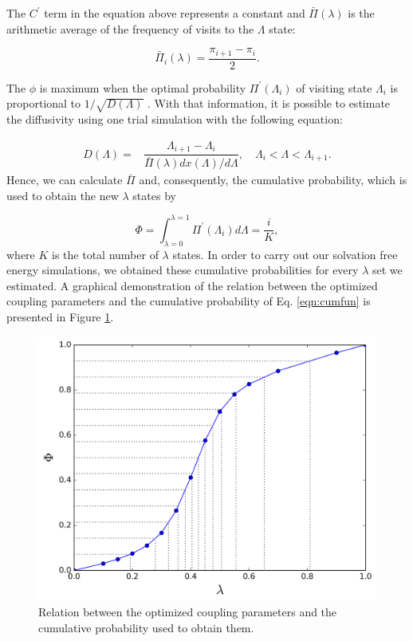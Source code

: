 The $C^{'} $ term in the equation above represents a constant and $\bar{\Pi} (\lambda)$ is the arithmetic average of the frequency of visits to the $\Lambda$ state:

\begin{equation}
\bar{\Pi}_{i} (\lambda) = \dfrac{\pi_{i+1} - \pi_{i}}{2}.
\label{eqn:barplambda}
\end{equation}

The $\phi$ is maximum when the optimal probability $\Pi^{'}(\Lambda_{i})$ of visiting state $\Lambda_{i}$ is proportional to $1/\sqrt{D(\Lambda)}$ \cite{trebst2004}. With that information, it is possible to estimate the diffusivity using one trial simulation with the following equation:

\begin{equation}
\begin{aligned}
D(\Lambda) {}=& \dfrac{\Lambda_{i+1} - \Lambda_{i}}{\bar{\Pi} (\lambda) {dx(\Lambda)}/{d \Lambda}}, \quad \Lambda_{i} < \Lambda < \Lambda_{i+1}.
\end{aligned}
\label{eqn:diff}
\end{equation}    
Hence, we can calculate $\bar{\Pi} $ and, consequently, the cumulative probability, which is used to obtain the new $\lambda$ states by

\begin{equation}
\Phi = \int_{\lambda =0}^{\lambda =1} \Pi^{'}(\Lambda_{i}) d \Lambda = \dfrac{i}{K},
\label{eqn:cumfun}
\end{equation}
where $K$ is the total number of $\lambda$ states. In order to carry out our solvation free energy simulations, we obtained these cumulative probabilities for every $\lambda$ set we estimated. A graphical demonstration of the relation between the optimized coupling parameters and the cumulative probability of Eq. \ref{eqn:cumfun} is presented in Figure \ref{fig:optimized_cdfexeample}.

\begin{figure}[h]
	\centering
	\includegraphics[width=0.8\linewidth]{Figures/optimized_cdfexeample}
	\caption{Relation between the optimized coupling parameters and the cumulative probability used to obtain them.}
	\label{fig:optimized_cdfexeample}
\end{figure}
\FloatBarrier
